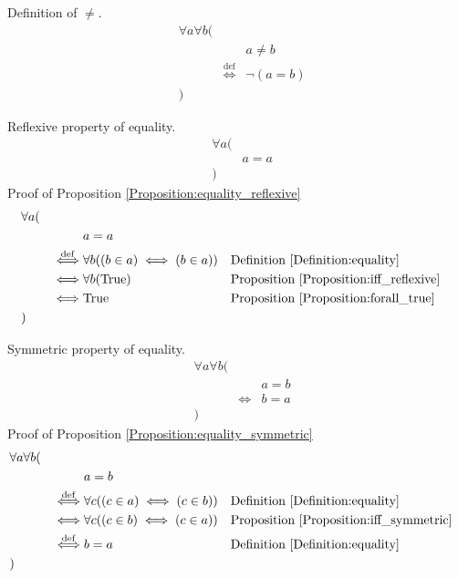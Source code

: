 \begin{defn}
\label{Definition:neq}
Definition of $\neq$.
\begin{align*}
& \forall a \forall b ( \\
& & & a \neq b \\
& & \overset{\operatorname{def}}{\iff} & \lnot (a = b) \\
& )
\end{align*}
\end{defn}

\begin{prop}
\label{Proposition:equality_reflexive}
Reflexive property of equality.
\begin{align*}
& \forall a ( \\
& & a = a \\
& )
\end{align*}
Proof of Proposition \ref{Proposition:equality_reflexive}
\begin{align*}
& \forall a ( \\
& & & a = a \\
& & \overset{\operatorname{def}}{\iff} & \forall b ((b \in a) \iff (b \in a))
&& \text{Definition \ref{Definition:equality}} \\
& & \iff & \forall b (\text{True})
&& \text{Proposition \ref{Proposition:iff_reflexive}} \\
& & \iff & \text{True}
&& \text{Proposition \ref{Proposition:forall_true}} \\
& )
\end{align*}
\end{prop}

\begin{prop}
\label{Proposition:equality_symmetric}
Symmetric property of equality.
\begin{align*}
& \forall a \forall b ( \\
& & & a = b \\
& & \iff & b = a \\
& )
\end{align*}
Proof of Proposition \ref{Proposition:equality_symmetric}
\begin{align*}
& \forall a \forall b ( \\
& & & a = b \\
& & \overset{\operatorname{def}}{\iff} & \forall c ((c \in a) \iff (c \in b))
&& \text{Definition \ref{Definition:equality}} \\
& & \iff & \forall c ((c \in b) \iff (c \in a))
&& \text{Proposition \ref{Proposition:iff_symmetric}} \\
& & \overset{\operatorname{def}}{\iff} & b = a
&& \text{Definition \ref{Definition:equality}} \\
& )
\end{align*}
\end{prop}

